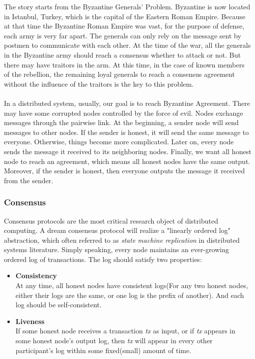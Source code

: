 \documentclass[
10pt, %
a4paper, %
oneside, %
headinclude,footinclude, %
BCOR5mm, %
]{scrartcl}
\begin{document}
The story starts from the Byzantine Generals' Problem. Byzantine is now located in Istanbul, Turkey, which is the capital of the Eastern Roman Empire. Because at that time the Byzantine Roman Empire was vast, for the purpose of defense, each army is very far apart. The generals can only rely on the message sent by postmen to communicate with each other. At the time of the war, all the generals in the Byzantine army should reach a consensus whether to attack or not. But there may have traitors in the arm. At this time, in the case of known members of the rebellion, the remaining loyal generals to reach a consensus agreement without the influence of the traitors is the key to this problem.\\ \\
In a distributed system, usually, our goal is to reach Byzantine Agreement. There may have some corrupted nodes controlled by the force of evil. Nodes exchange messages through the pairwise link. At the beginning, a sender node will send messages to other nodes. If the sender is honest, it will send the same message to everyone. Otherwise, things become more complicated. Later on, every node sends the message it received to its neighboring nodes.  Finally, we want all honest node to reach an agreement, which means all honest nodes have the same output. Moreover, if the sender is honest, then everyone outputs the message it received from the sender.

\subsubsection{Consensus}
Consensus protocols are the most critical research object of distributed computing. A dream consensus protocol will realize a "linearly ordered log" abstraction, which often referred to as \textit{state machine replication} in distributed systems literature. Simply speaking, every node maintains an ever-growing ordered log of transactions. The log should satisfy two properties:
\begin{itemize}
    \item \textbf{Consistency} \\
    At any time, all honest nodes have consistent logs(For any two honest nodes, either their logs are the same, or one log is the prefix of another). And each log should be self-consistent. 
    \item \textbf{Liveness} \\
    If some honest node receives a transaction \textit{tx} as input, or if \textit{tx} appears in some honest node's output log, then \textit{tx} will appear in every other participant's log within some fixed(small) amount of time.
\end{itemize}
\end{document}
